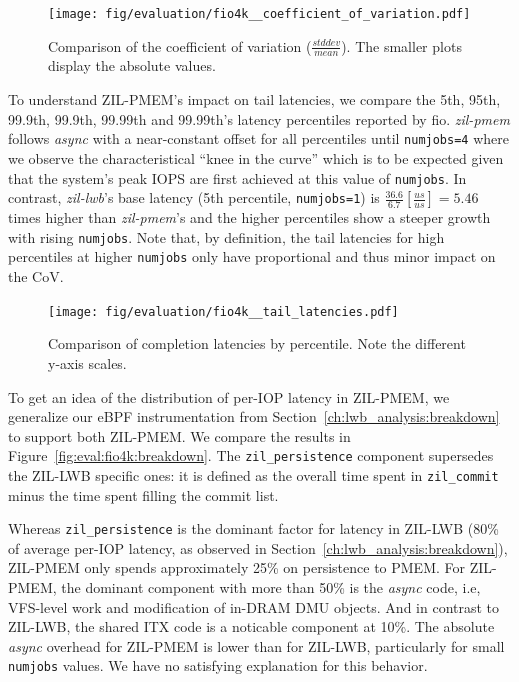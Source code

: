 \documentclass[12pt,a4paper,twoside]{book}
\begin{document}
\begin{figure}[H]
    \centering
    \texttt{[image: fig/evaluation/fio4k\_\_coefficient\_of\_variation.pdf]}
    \caption{Comparison of the coefficient of variation ($\frac{stddev}{mean}$). The smaller plots display the absolute values.}
    \label{fig:eval:fio4k:cov}
\end{figure}

To understand ZIL-PMEM's impact on tail latencies, we compare the 5th, 95th, 99.9th, 99.9th, 99.99th and 99.99th's latency percentiles reported by fio.
\textit{zil-pmem} follows \textit{async} with a near-constant offset for all percentiles until \lstinline{numjobs=4} where we observe the characteristical ``knee in the curve'' which is to be expected given that the system's peak IOPS are first achieved at this value of \lstinline{numjobs}.
In contrast, \textit{zil-lwb}'s base latency (5th percentile, \lstinline{numjobs=1}) is $\frac{36.6}{6.7} [\frac{us}{us}] = 5.46$ times higher than \textit{zil-pmem}'s and the higher percentiles show a steeper growth with rising \lstinline{numjobs}.
Note that, by definition, the tail latencies for high percentiles at higher \lstinline{numjobs} only have proportional and thus minor impact on the CoV.

\begin{figure}[H]
    \centering
    \texttt{[image: fig/evaluation/fio4k\_\_tail\_latencies.pdf]}
    \caption{Comparison of completion latencies by percentile. Note the different y-axis scales.}
\end{figure}

To get an idea of the distribution of per-IOP latency in ZIL-PMEM, we generalize our eBPF instrumentation from Section~\ref{ch:lwb_analysis:breakdown} to support both ZIL-PMEM.
We compare the results in Figure~\ref{fig:eval:fio4k:breakdown}.
The \lstinline{zil_persistence} component supersedes the ZIL-LWB specific ones: it is defined as the overall time spent in \lstinline{zil_commit} minus the time spent filling the commit list.

Whereas \lstinline{zil_persistence} is the dominant factor for latency in ZIL-LWB (80\% of average per-IOP latency, as observed in Section~\ref{ch:lwb_analysis:breakdown}), ZIL-PMEM only spends approximately 25\% on persistence to PMEM.
For ZIL-PMEM, the dominant component with more than 50\% is the \textit{async} code, i.e, VFS-level work and modification of in-DRAM DMU objects.
And in contrast to ZIL-LWB, the shared ITX code is a noticable component at 10\%.
The absolute \textit{async} overhead for ZIL-PMEM is lower than for ZIL-LWB, particularly for small \lstinline{numjobs} values.
We have no satisfying explanation for this behavior.
\end{document}
